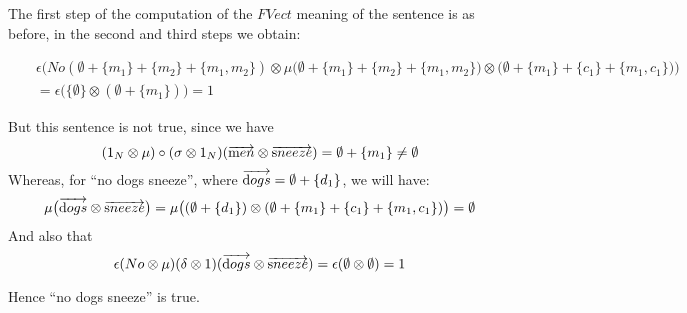 The first step of the computation  of the $FVect$ meaning of the sentence is as before, in the second and third steps we obtain:

\begin{eqnarray*}
&&\epsilon \Big (No (\emptyset + \{m_1\} + \{m_2\} + \{m_1, m_2\}) \otimes  \mu\big(\emptyset  + \{m_1\}  + \{m_2\}  + \{m_1, m_2\}) \otimes (\emptyset + \{m_1\} + \{c_1\} + \{m_1, c_1\}\big)\Big)\\
&&= 
\epsilon \Big(\{\emptyset\} \otimes (\emptyset + \{m_1\}) \Big) = 1
\end{eqnarray*}

\noindent
But this sentence is not true, since we have 
\[
(1_N \otimes \mu) \circ (\sigma \otimes 1_N)(\overrightarrow{\text men} \otimes \overrightarrow{\text sneeze})   = \emptyset + \{m_1\} \neq \emptyset
\]
Whereas, for  ``no dogs sneeze'', where $\overrightarrow{\text dogs} = \emptyset + \{d_1\}$, we will have:
\[
\mu\big(\overrightarrow{\text dogs} \otimes \overrightarrow{\text sneeze}\big) = \mu \big((\emptyset + \{d_1\}) \otimes (\emptyset + \{m_1\} + \{c_1\} + \{m_1, c_1\})\big) = \emptyset
\]
And also that 
\[\epsilon(No \otimes \mu) (\delta \otimes 1)(\overrightarrow{\text dogs} \otimes \overrightarrow{\text sneeze}) =
\epsilon(\emptyset \otimes \emptyset) = 1
\]

\noindent
Hence ``no dogs sneeze'' is true. 

